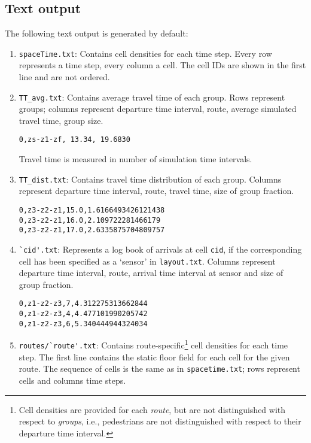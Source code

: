 \documentclass[a4paper,12pt]{article}
\begin{document}
\subsection{Text output}
The following text output is generated by default:
\begin{enumerate}

\item \verb+spaceTime.txt+: Contains cell densities for each time step. Every row represents a time step, every column a cell. The cell IDs are shown in the first line and are not ordered.

\item \verb+TT_avg.txt+: Contains average travel time of each group. Rows represent groups; columns represent departure time interval, route, average simulated travel time, group size.
\begin{Verbatim}
0,zs-z1-zf, 13.34, 19.6830
\end{Verbatim}
Travel time is measured in number of simulation time intervals.

\item \verb+TT_dist.txt+: Contains travel time distribution of each group. Columns represent departure time interval, route, travel time, size of group fraction.
\begin{Verbatim}
0,z3-z2-z1,15.0,1.6166493426121438
0,z3-z2-z1,16.0,2.109722281466179
0,z3-z2-z1,17.0,2.6335875704809757
\end{Verbatim}

\item \verb+`cid'.txt+: Represents a log book of arrivals at cell \verb+cid+, if the corresponding cell has been specified as a `sensor' in \verb+layout.txt+. Columns represent departure time interval, route, arrival time interval at sensor and size of group fraction.
\begin{Verbatim}
0,z1-z2-z3,7,4.312275313662844
0,z1-z2-z3,4,4.477101990205742
0,z1-z2-z3,6,5.340444944324034
\end{Verbatim}

\item \verb+routes/`route'.txt+: Contains route-specific\footnote{Cell densities are provided for each \emph{route}, but are not distinguished with respect to \emph{groups}, i.e., pedestrians are not distinguished with respect to their departure time interval.} cell densities for each time step. The first line contains the static floor field for each cell for the given route. The sequence of cells is the same as in \verb+spacetime.txt+; rows represent cells and columns time steps.

\end{enumerate}
\end{document}
